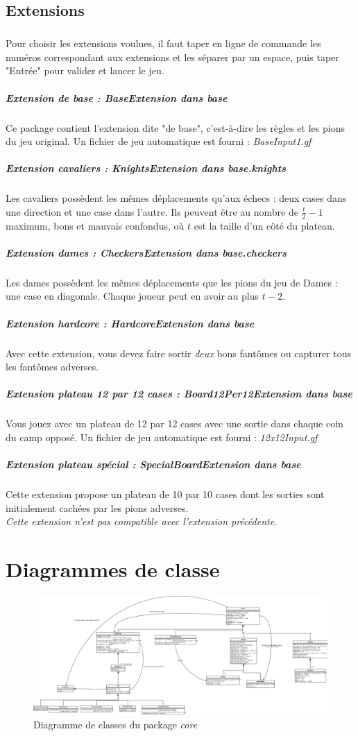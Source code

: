 \documentclass[]{report}
\begin{document}
\subsection{Extensions}
\subparagraph*{}
Pour choisir les extensions voulues, il faut taper en ligne de commande les numéros correspondant aux extensions et les séparer par un espace, puis taper "Entrée" pour valider et lancer le jeu.
\subparagraph{Extension de base : \textit{BaseExtension} dans \textit{base}}
Ce package contient l'extension dite "de base", c'est-à-dire les règles et les pions du jeu original. Un fichier de jeu automatique est fourni : \textit{BaseInput1.gf}

\subparagraph{Extension cavaliers : \textit{KnightsExtension} dans \textit{base.knights}}
Les cavaliers possèdent les mêmes déplacements qu'aux échecs : deux cases dans une direction et une case dans l'autre. Ils peuvent être au nombre de $\frac{t}{2}-1$ maximum, bons et mauvais confondus, où $t$ est la taille d'un côté du plateau.

\subparagraph{Extension dames : \textit{CheckersExtension} dans \textit{base.checkers}}
Les dames possèdent les mêmes déplacements que les pions du jeu de Dames : une case en diagonale. Chaque joueur peut en avoir au plus $t - 2$.

\subparagraph{Extension hardcore : \textit{HardcoreExtension} dans \textit{base}}
Avec cette extension, vous devez faire sortir \emph{deux} bons fantômes ou capturer tous les fantômes adverses.

\subparagraph{Extension plateau 12 par 12 cases : \textit{Board12Per12Extension} dans \textit{base}}
Vous jouez avec un plateau de 12 par 12 cases avec une sortie dans chaque coin du camp opposé. Un fichier de jeu automatique est fourni : \textit{12x12Input.gf}

\subparagraph{Extension plateau spécial : \textit{SpecialBoardExtension} dans \textit{base}}
Cette extension propose un plateau de 10 par 10 cases dont les sorties sont initialement cachées par les pions adverses.\\
\emph{Cette extension n'est pas compatible avec l'extension précédente.}

\section{Diagrammes de classe}

\begin{figure}[!h]
	\caption{Diagramme de classes du package \textit{core}}
	\includegraphics[width=\textwidth]{core.png}
\end{figure}
\end{document}

